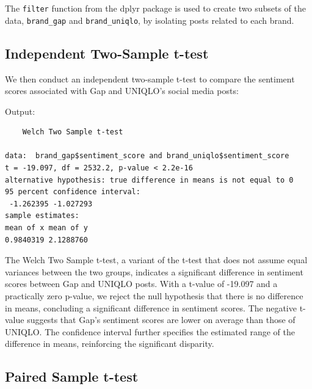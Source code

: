 \documentclass[
]{book}
\newenvironment{Shaded}{\begin{snugshade}}{\end{snugshade}}
\newcommand{\FunctionTok}[1]{\textcolor[rgb]{0.13,0.29,0.53}{\textbf{#1}}}
\newcommand{\NormalTok}[1]{#1}
\newcommand{\SpecialCharTok}[1]{\textcolor[rgb]{0.81,0.36,0.00}{\textbf{#1}}}
\begin{document}
The \texttt{filter} function from the dplyr package is used to create two subsets of the data, \texttt{brand\_gap} and \texttt{brand\_uniqlo}, by isolating posts related to each brand.

\hypertarget{independent-two-sample-t-test}{%
\subsection{Independent Two-Sample t-test}\label{independent-two-sample-t-test}}

We then conduct an independent two-sample t-test to compare the sentiment scores associated with Gap and UNIQLO's social media posts:

\begin{Shaded}
\end{Shaded}

Output:

\begin{verbatim}
    Welch Two Sample t-test

data:  brand_gap$sentiment_score and brand_uniqlo$sentiment_score
t = -19.097, df = 2532.2, p-value < 2.2e-16
alternative hypothesis: true difference in means is not equal to 0
95 percent confidence interval:
 -1.262395 -1.027293
sample estimates:
mean of x mean of y 
0.9840319 2.1288760 
\end{verbatim}

The Welch Two Sample t-test, a variant of the t-test that does not assume equal variances between the two groups, indicates a significant difference in sentiment scores between Gap and UNIQLO posts. With a t-value of -19.097 and a practically zero p-value, we reject the null hypothesis that there is no difference in means, concluding a significant difference in sentiment scores. The negative t-value suggests that Gap's sentiment scores are lower on average than those of UNIQLO. The confidence interval further specifies the estimated range of the difference in means, reinforcing the significant disparity.

\hypertarget{paired-sample-t-test}{%
\subsection{Paired Sample t-test}\label{paired-sample-t-test}}
\end{document}
